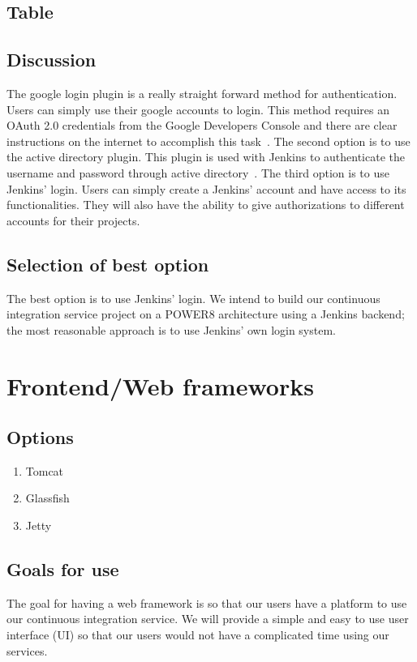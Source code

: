 \documentclass[10pt,letterpaper,onecolumn,journal]{IEEEtran}
\begin{document}
\subsection{Table}
\subsection{Discussion}
The google login plugin is a really straight forward method for authentication.
Users can simply use their google accounts to login.
This method requires an OAuth 2.0 credentials from the Google Developers Console and there are clear instructions on the internet to accomplish this task~\cite{googlelogin}.
The second option is to use the active directory plugin.
This plugin is used with Jenkins to authenticate the username and password through active directory~\cite{activedirectory}.
The third option is to use Jenkins’ login.
Users can simply create a Jenkins’ account and have access to its functionalities.
They will also have the ability to give authorizations to different accounts for their projects.
\subsection{Selection of best option}
The best option is to use Jenkins’ login.
We intend to build our continuous integration service project on a POWER8 architecture using a Jenkins backend; the most reasonable approach is to use Jenkins’ own login system.

\section{Frontend/Web frameworks}
\subsection{Options}
\begin{enumerate}
  \item Tomcat
  \item Glassfish
  \item Jetty
\end{enumerate}
\subsection{Goals for use}
The goal for having a web framework is so that our users have a platform to use our continuous integration service.
We will provide a simple and easy to use user interface (UI) so that our users would not have a complicated time using our services.
\end{document}
